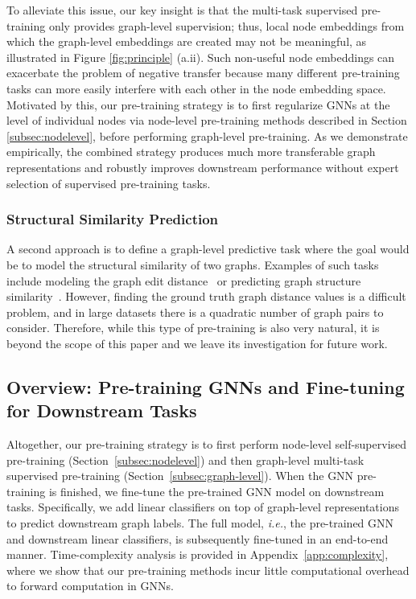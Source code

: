 \documentclass{article} \usepackage{iclr2020_conference,times}
\numberwithin{equation}{section}
\theoremstyle{plain}
\theoremstyle{definition}
\theoremstyle{remark}
\newcommand{\ie}{\textit{i.e.}}
\begin{document}
To alleviate this issue, our key insight is that the multi-task supervised pre-training only provides graph-level supervision; thus, local node embeddings from which the graph-level embeddings are created may not be meaningful, as illustrated in Figure \ref{fig:principle} (a.ii).
Such non-useful node embeddings can exacerbate the problem of negative transfer because many different pre-training tasks can more easily interfere with each other in the node embedding space.
Motivated by this, our pre-training strategy is to first regularize GNNs at the level of individual nodes via node-level pre-training methods described in Section \ref{subsec:nodelevel}, before performing graph-level pre-training. As we demonstrate empirically, the combined strategy produces much more transferable graph representations and robustly improves downstream performance without expert selection of supervised pre-training tasks.

\subsubsection{Structural Similarity Prediction}

A second approach is to define a graph-level predictive task where the goal would be to model the structural similarity of two graphs. Examples of such tasks include modeling the graph edit distance~\citep{bai2019unsupervised} or predicting graph structure similarity~\citep{navarin2018pre}. However, finding the ground truth graph distance values is a difficult problem, and in large datasets there is a quadratic number of graph pairs to consider. Therefore, while this type of pre-training is also very natural, it is beyond the scope of this paper and we leave its investigation for future work.

\subsection{Overview: Pre-training GNNs and Fine-tuning for Downstream Tasks}
\label{subsec:finetune}

Altogether, our pre-training strategy is to first perform node-level self-supervised pre-training (Section~\ref{subsec:nodelevel}) and then graph-level multi-task supervised pre-training (Section~\ref{subsec:graph-level}).
When the GNN pre-training is finished, we fine-tune the pre-trained GNN model on downstream tasks. Specifically, we add linear classifiers on top of graph-level representations to predict downstream graph labels. The full model, \ie, the pre-trained GNN and downstream linear classifiers, is subsequently fine-tuned in an end-to-end manner. Time-complexity analysis is provided in Appendix~\ref{app:complexity}, where we show that our pre-training methods incur little computational overhead to forward computation in GNNs.
\end{document}
